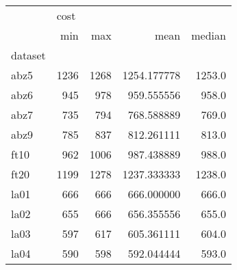 \begin{tabular}{lrrrr}
\toprule
{} & \multicolumn{4}{l}{cost} \\
{} &   min &   max &         mean &  median \\
dataset &       &       &              &         \\
\midrule
abz5    &  1236 &  1268 &  1254.177778 &  1253.0 \\
abz6    &   945 &   978 &   959.555556 &   958.0 \\
abz7    &   735 &   794 &   768.588889 &   769.0 \\
abz9    &   785 &   837 &   812.261111 &   813.0 \\
ft10    &   962 &  1006 &   987.438889 &   988.0 \\
ft20    &  1199 &  1278 &  1237.333333 &  1238.0 \\
la01    &   666 &   666 &   666.000000 &   666.0 \\
la02    &   655 &   666 &   656.355556 &   655.0 \\
la03    &   597 &   617 &   605.361111 &   604.0 \\
la04    &   590 &   598 &   592.044444 &   593.0 \\
\bottomrule
\end{tabular}
